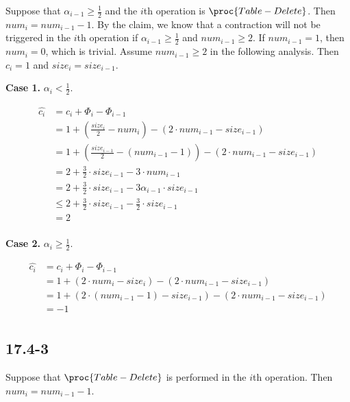 Suppose that $\alpha_{i-1} \geq \frac{1}{2}$
and the $i$th operation is $\proc{Table-Delete}$.
Then $num_i = num_{i-1} - 1$.
By the claim, we know that a contraction will not be triggered
in the $i$th operation
if $\alpha_{i-1} \geq \frac{1}{2}$ and 
$num_{i-1} \geq 2$.
If $num_{i-1} = 1$, then $num_i = 0$, which is trivial.
Assume $num_{i-1} \geq 2$ in the following analysis.
Then $c_i = 1$ and $size_i = size_{i-1}$.

\textbf{Case 1.}
$\alpha_i < \frac{1}{2}$.

\begin{equation*}
\begin{split}
    \hat{c_i} & = c_i + \Phi_i - \Phi_{i-1} \\
    & = 1 + (\frac{size_i}{2} - num_i) - (2 \cdot num_{i-1} - size_{i-1}) \\
    & = 1 + (\frac{size_{i-1}}{2} - (num_{i-1} - 1)) - (2 \cdot num_{i-1} - size_{i-1}) \\
    & = 2 + \frac{3}{2} \cdot size_{i-1} - 3 \cdot num_{i-1} \\
    & = 2 + \frac{3}{2} \cdot size_{i-1} - 3 \alpha_{i-1} \cdot size_{i-1} \\
    & \leq 2 + \frac{3}{2} \cdot size_{i-1} - \frac{3}{2} \cdot size_{i-1} \\
    & = 2 \\
\end{split}
\end{equation*}

\textbf{Case 2.}
$\alpha_i \geq \frac{1}{2}$.

\begin{equation*}
\begin{split}
    \hat{c_i} & = c_i + \Phi_i - \Phi_{i-1} \\
    & = 1 + (2 \cdot num_i - size_i) - (2 \cdot num_{i-1} - size_{i-1}) \\
    & = 1 + (2 \cdot (num_{i-1} - 1) - size_{i-1}) - (2 \cdot num_{i-1} - size_{i-1}) \\
    & = -1 \\
\end{split}
\end{equation*}

\subsection*{17.4-3}

Suppose that $\proc{Table-Delete}$ is performed in the $i$th operation.
Then $num_i = num_{i-1} - 1$.

